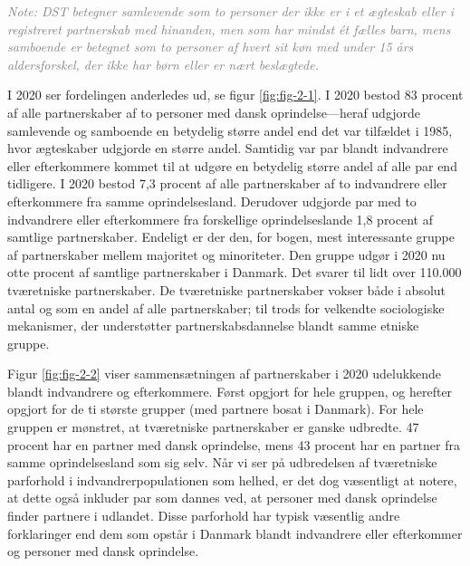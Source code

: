 \documentclass[
]{book}
\begin{document}
\begin{footnotesize}\textit{\textcolor{gray}{
Note: DST betegner samlevende som to personer der ikke er i et ægteskab eller i registreret partnerskab med hinanden, men som har mindst ét fælles barn, mens samboende er betegnet som to personer af hvert sit køn med under 15 års aldersforskel, der ikke har børn eller er nært beslægtede.
}}
\end{footnotesize}

\newpage

I 2020 ser fordelingen anderledes ud, se figur \ref{fig:fig-2-1}. I 2020 bestod 83 procent af alle partnerskaber af to personer med dansk oprindelse---heraf udgjorde samlevende og samboende en betydelig større andel end det var tilfældet i 1985, hvor ægteskaber udgjorde en større andel. Samtidig var par blandt indvandrere eller efterkommere kommet til at udgøre en betydelig større andel af alle par end tidligere. I 2020 bestod 7,3 procent af alle partnerskaber af to indvandrere eller efterkommere fra samme oprindelsesland. Derudover udgjorde par med to indvandrere eller efterkommere fra forskellige oprindelseslande 1,8 procent af samtlige partnerskaber. Endeligt er der den, for bogen, mest interessante gruppe af partnerskaber mellem majoritet og minoriteter. Den gruppe udgør i 2020 nu otte procent af samtlige partnerskaber i Danmark. Det svarer til lidt over 110.000 tværetniske partnerskaber. De tværetniske partnerskaber vokser både i absolut antal og som en andel af alle partnerskaber; til trods for velkendte sociologiske mekanismer, der understøtter partnerskabsdannelse blandt samme etniske gruppe.

Figur \ref{fig:fig-2-2} viser sammensætningen af partnerskaber i 2020 udelukkende blandt indvandrere og efterkommere. Først opgjort for hele gruppen, og herefter opgjort for de ti største grupper (med partnere bosat i Danmark). For hele gruppen er mønstret, at tværetniske partnerskaber er ganske udbredte. 47 procent har en partner med dansk oprindelse, mens 43 procent har en partner fra samme oprindelsesland som sig selv. Når vi ser på udbredelsen af tværetniske parforhold i indvandrerpopulationen som helhed, er det dog væsentligt at notere, at dette også inkluder par som dannes ved, at personer med dansk oprindelse finder partnere i udlandet. Disse parforhold har typisk væsentlig andre forklaringer end dem som opstår i Danmark blandt indvandrere eller efterkommer og personer med dansk oprindelse.

\newpage
\end{document}
